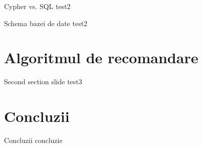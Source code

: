 \documentclass{beamer}
\begin{document}
\begin{frame}{Cypher vs. SQL}
    test2
\end{frame}

\begin{frame}{Schema bazei de date}
    test2
\end{frame}

\section{Algoritmul de recomandare}
\frame{\tableofcontents[currentsection]}
\begin{frame}{Second section slide}
    test3
\end{frame}

\section{Concluzii}
\frame{\tableofcontents[currentsection]}
\begin{frame}{Concluzii}
	concluzie
\end{frame}
\end{document}
